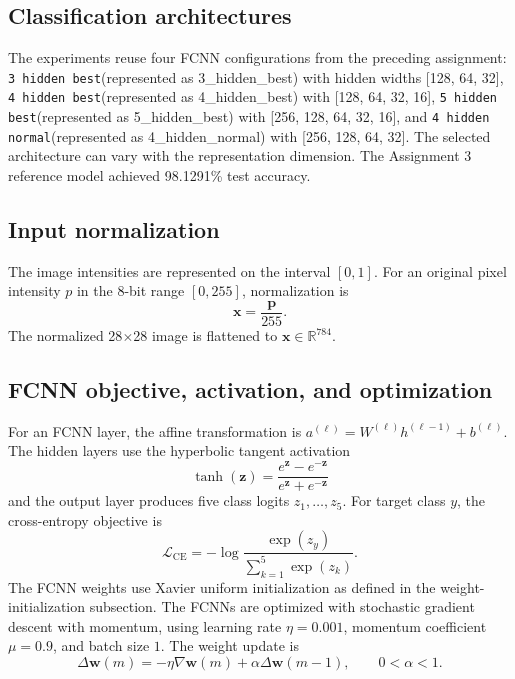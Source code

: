 \documentclass[conference,onecolumn]{IEEEtran}
\begin{document}
\subsection{Classification architectures}
The experiments reuse four FCNN configurations from the preceding assignment: \texttt{3 hidden best}(represented as 3\_hidden\_best) with hidden widths [128, 64, 32], \texttt{4 hidden best}(represented as 4\_hidden\_best) with [128, 64, 32, 16], \texttt{5 hidden best}(represented as 5\_hidden\_best) with [256, 128, 64, 32, 16], and \texttt{4 hidden normal}(represented as 4\_hidden\_normal) with [256, 128, 64, 32]. The selected architecture can vary with the representation dimension. The Assignment 3 reference model achieved 98.1291\% test accuracy.


\subsection{Input normalization}
The image intensities are represented on the interval $[0,1]$. For an original pixel
intensity $p$ in the 8-bit range $[0,255]$, normalization is
\begin{equation}
\mathbf{x}=\frac{\mathbf{p}}{255}.
\end{equation}
The normalized 28$\times$28 image is flattened to $\mathbf{x}\in\mathbb{R}^{784}$.

\subsection{FCNN objective, activation, and optimization}
For an FCNN layer, the affine transformation is $a^{(\ell)}=W^{(\ell)}h^{(\ell-1)}+
b^{(\ell)}$. The hidden layers use the hyperbolic tangent activation
\begin{equation}
\tanh(\mathbf{z})=\frac{e^\mathbf{z}-e^{-\mathbf{z}}}{e^\mathbf{z}+e^{-\mathbf{z}}}
\end{equation}
and the output layer produces five class logits $z_1,\ldots,z_5$. For target class $y$,
the cross-entropy objective is
\begin{equation}
\mathcal{L}_{\mathrm{CE}}=-\log
\frac{\exp(z_y)}{\sum_{k=1}^{5}\exp(z_k)}.
\end{equation}
The FCNN weights use Xavier uniform initialization as defined in the weight-initialization subsection. The FCNNs are optimized with stochastic gradient descent with momentum, using learning
rate $\eta=0.001$, momentum coefficient $\mu=0.9$, and batch size $1$. The weight
update is
\begin{equation} 
\Delta \mathbf{w}(m) = -\eta\nabla{\mathbf{w}}(m) + \alpha\Delta \mathbf{w}(m-1), \qquad 0<\alpha<1. \label{eq:momentum} 
\end{equation} 
\end{document}
